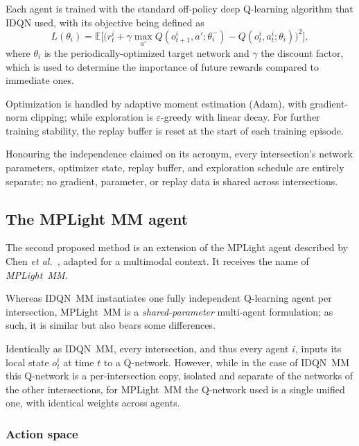 Each agent is trained with the standard off-policy deep Q-learning algorithm that IDQN used, with its objective being defined as
\begin{equation} \label{ec:idqnmm_obj}
L(\theta_i) = \mathbb{E}\Big[\big(r_t^i + \gamma \max_{a'} Q(o_{t+1}^i, a'; \theta_i^{-}) - Q(o_t^i, a_t^i; \theta_i)\big)^2\Big],
\end{equation}
\noindent where $\theta_i$ is the periodically-optimized target network and $\gamma$ the discount factor, which is used to determine the importance of future rewards compared to immediate ones.

Optimization is handled by adaptive moment estimation (Adam), with gradient-norm clipping; while exploration is $\varepsilon$-greedy with linear decay. For further training stability, the replay buffer is reset at the start of each training episode.

Honouring the independence claimed on its acronym, every intersection's network parameters, optimizer state, replay buffer, and exploration schedule are entirely separate; no gradient, parameter, or replay data is shared across intersections.

\subsection{The MPLight MM agent} \label{subsec:mplight_mm}
The second proposed method is an extension of the MPLight agent described by Chen \textit{et al.}~\cite{Chen2020}, adapted for a multimodal context. It receives the name of \textit{MPLight~MM}.

\medskip 

\noindent Whereas IDQN~MM instantiates one fully independent Q-learning agent per intersection, MPLight~MM is a \textit{shared-parameter} multi-agent formulation; as such, it is similar but also bears some differences.

Identically as IDQN~MM, every intersection, and thus every agent $i$, inputs its local state $o_t^i$ at time $t$ to a Q-network. However, while in the case of IDQN~MM this Q-network is a per-intersection copy, isolated and separate of the networks of the other intersections, for MPLight~MM the Q-network used is a single unified one, with identical weights across agents.
 
\subsubsection{Action space} \label{subsubsec:mp_action_space}
 
